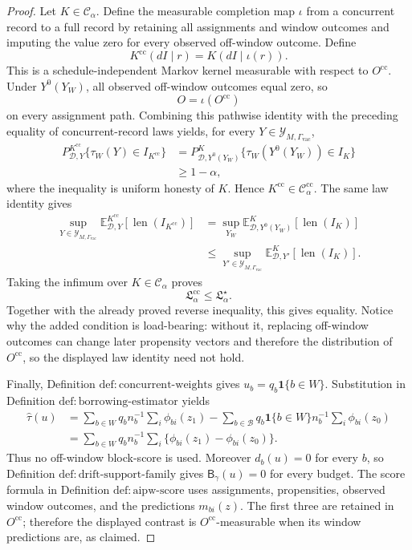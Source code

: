 \documentclass{article}
\begin{document}
\begin{proof}
Let \(K\in\mathcal C_\alpha\).  Define the measurable completion map \(\iota\) from a concurrent record to a full record by retaining all assignments and window outcomes and imputing the value zero for every observed off-window outcome.  Define
\[
 K^{\mathrm{cc}}(dI\mid r)=K(dI\mid\iota(r)).
\]
This is a schedule-independent Markov kernel measurable with respect to \(O^{\mathrm{cc}}\).  Under \(Y^0(Y_W)\), all observed off-window outcomes equal zero, so
\[
 O=\iota(O^{\mathrm{cc}})
\]
on every assignment path.  Combining this pathwise identity with the preceding equality of concurrent-record laws yields, for every \(Y\in\mathcal Y_{M,\Gamma_{\mathrm{vac}}}\),
\[
 \begin{aligned}
 P^{K^{\mathrm{cc}}}_{\mathcal D,Y}
 \{\tau_W(Y)\in I_{K^{\mathrm{cc}}}\}
 &=P^K_{\mathcal D,Y^0(Y_W)}
 \{\tau_W(Y^0(Y_W))\in I_K\}\\
 &\ge1-\alpha,
 \end{aligned}
\]
where the inequality is uniform honesty of \(K\).  Hence \(K^{\mathrm{cc}}\in\mathcal C_\alpha^{\mathrm{cc}}\).  The same law identity gives
\[
 \begin{aligned}
 \sup_{Y\in\mathcal Y_{M,\Gamma_{\mathrm{vac}}}}
 \mathbb E^{K^{\mathrm{cc}}}_{\mathcal D,Y}
 [\operatorname{len}(I_{K^{\mathrm{cc}}})]
 &=\sup_{Y_W}
 \mathbb E^K_{\mathcal D,Y^0(Y_W)}
 [\operatorname{len}(I_K)]\\
 &\le\sup_{Y'\in\mathcal Y_{M,\Gamma_{\mathrm{vac}}}}
 \mathbb E^K_{\mathcal D,Y'}[\operatorname{len}(I_K)].
 \end{aligned}
\]
Taking the infimum over \(K\in\mathcal C_\alpha\) proves
\[
 \mathfrak L_\alpha^{\mathrm{cc}}\le\mathfrak L_\alpha^\star.
\]
Together with the already proved reverse inequality, this gives equality.  Notice why the added condition is load-bearing: without it, replacing off-window outcomes can change later propensity vectors and therefore the distribution of \(O^{\mathrm{cc}}\), so the displayed law identity need not hold.

Finally, Definition \(\mathrm{def:concurrent\text{-}weights}\) gives \(u_b=q_b\mathbf 1\{b\in W\}\).  Substitution in Definition \(\mathrm{def:borrowing\text{-}estimator}\) yields
\[
 \begin{aligned}
 \widehat\tau(u)
 &=\sum_{b\in W}q_bn_b^{-1}\sum_i\phi_{bi}(z_1)
 -\sum_{b\in\mathcal B}q_b\mathbf 1\{b\in W\}n_b^{-1}\sum_i\phi_{bi}(z_0)\\
 &=\sum_{b\in W}q_bn_b^{-1}\sum_i
 \{\phi_{bi}(z_1)-\phi_{bi}(z_0)\}.
 \end{aligned}
\]
Thus no off-window block-score is used.  Moreover \(d_b(u)=0\) for every \(b\), so Definition \(\mathrm{def:drift\text{-}support\text{-}family}\) gives \(\mathsf B_\gamma(u)=0\) for every budget.  The score formula in Definition \(\mathrm{def:aipw\text{-}score}\) uses assignments, propensities, observed window outcomes, and the predictions \(m_{bi}(z)\).  The first three are retained in \(O^{\mathrm{cc}}\); therefore the displayed contrast is \(O^{\mathrm{cc}}\)-measurable when its window predictions are, as claimed.


\end{proof}
\end{document}
